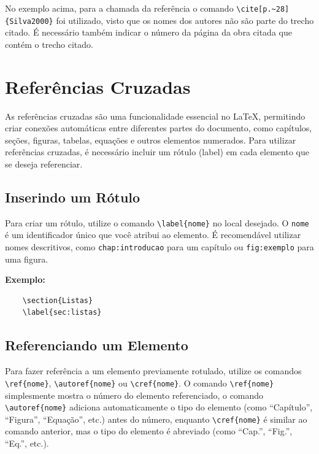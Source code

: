 No exemplo acima, para a chamada da referência o comando \verb|\cite[p.~28]{Silva2000}| foi utilizado, visto que os nomes dos autores não são parte do trecho citado. É necessário também indicar o número da página da obra citada que contém o trecho citado.

\section{Referências Cruzadas}
\label{sec:referenciasCruzadas}

As referências cruzadas são uma funcionalidade essencial no \LaTeX{}, permitindo criar conexões automáticas entre diferentes partes do documento, como capítulos, seções, figuras, tabelas, equações e outros elementos numerados. Para utilizar referências cruzadas, é necessário incluir um rótulo ({\ttfamily label}) em cada elemento que se deseja referenciar.

\subsection{Inserindo um Rótulo}
Para criar um rótulo, utilize o comando \verb|\label{nome}| no local desejado. O \verb|nome| é um identificador único que você atribui ao elemento. É recomendável utilizar nomes descritivos, como \verb|chap:introducao| para um capítulo ou \verb|fig:exemplo| para uma figura. 

\textbf{Exemplo:}
\begin{verbatim}
    \section{Listas}
    \label{sec:listas}
\end{verbatim}

\subsection{Referenciando um Elemento}
Para fazer referência a um elemento previamente rotulado, utilize os comandos \verb|\ref{nome}|, \verb|\autoref{nome}| ou \verb|\cref{nome}|. O comando \verb|\ref{nome}| simplesmente mostra o número do elemento referenciado, o comando \verb|\autoref{nome}| adiciona automaticamente o tipo do elemento (como ``Capítulo'', ``Figura'', ``Equação'', etc.) antes do número, enquanto \verb|\cref{nome}| é similar ao comando anterior, mas o tipo do elemento é abreviado (como ``Cap.'', ``Fig.'', ``Eq.'', etc.).

